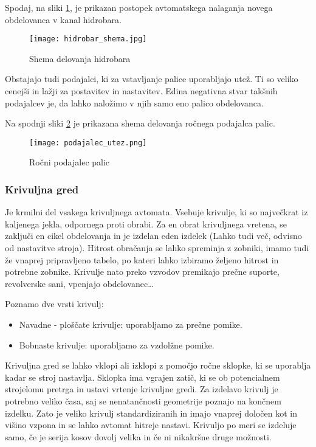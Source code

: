 Spodaj, na sliki \ref{hidrobar_nalaganje}, je prikazan postopek
avtomatskega nalaganja novega obdelovanca v kanal hidrobara.
\begin{figure}[H]
    \begin{center}
        \texttt{[image: hidrobar\_shema.jpg]}
        \caption{Shema delovanja hidrobara
                \cite{interna}}   
        \label{hidrobar_nalaganje}
    \end{center}
\end{figure}

Obstajajo tudi podajalci, ki za vstavljanje palice uporabljajo 
utež. Ti so veliko cenejši in lažji za postavitev in nastavitev. 
Edina negativna stvar takšnih podajalcev je, da lahko naložimo v 
njih samo eno palico obdelovanca.
 
Na spodnji sliki \ref{shema_rocnega_podajalca} je prikazana shema 
delovanja ročnega podajalca palic.

\begin{figure}[H]
    \begin{center}
        \texttt{[image: podajalec\_utez.png]}
        \caption{Ročni podajalec palic
                \cite{interna}}  
        \label{shema_rocnega_podajalca} 
    \end{center}
\end{figure}

\newpage

\subsubsection{Krivuljna gred}
Je krmilni del vsakega krivuljnega avtomata. Vsebuje krivulje, 
ki so največkrat iz kaljenega jekla, odpornega proti obrabi. Za en 
obrat krivuljnega vretena, se zaključi en cikel obdelovanja in je 
izdelan eden izdelek (Lahko tudi več, odvisno od nastavitve stroja). 
Hitrost obračanja se lahko spreminja z 
zobniki, imamo tudi že vnaprej pripravljeno tabelo, po kateri 
lahko izbiramo željeno hitrost in potrebne zobnike. Krivulje nato 
preko vzvodov premikajo prečne suporte, 
revolverske sani, vpenjajo obdelovanec… 

\noindent Poznamo dve vrsti krivulj:

\begin{itemize}
    \item Navadne - ploščate krivulje: uporabljamo za prečne pomike.
    \item Bobnaste krivulje: uporabljamo za vzdolžne pomike.
\end{itemize}

Krivuljna gred se lahko vklopi ali izklopi z pomočjo ročne sklopke,
ki se uporablja kadar se stroj nastavlja. Sklopka ima vgrajen 
zatič, ki se ob potencialnem strojelomu pretrga in ustavi vrtenje 
krivuljne gredi. Za izdelavo krivulj je potrebno veliko časa, saj 
se nenatančnosti geometrije poznajo na končnem izdelku. Zato je 
veliko krivulj standardiziranih in imajo vnaprej določen kot in 
višino vzpona in se lahko avtomat hitreje nastavi. Krivuljo po 
meri se izdeluje samo, če je serija kosov dovolj velika in če ni 
nikakršne druge možnosti.

\newpage

